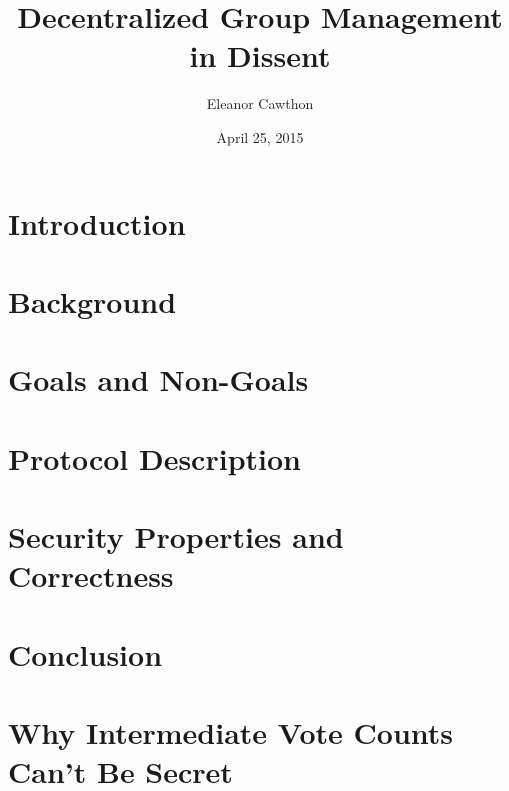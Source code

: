 \documentclass[finalcopy,nolof,nolot]{srpaper}
\title{Decentralized Group Management in Dissent}
\author{Eleanor Cawthon}
\date{April 25, 2015}
\begin{document}
\frontmatter

\chapter{Introduction}\label{Chapter:Intro}


\chapter{Background}\label{Chapter:Background}


\chapter{Goals and Non-Goals}\label{Chapter:Security}


\chapter{Protocol Description}\label{Chapter:Protocol}


\chapter{Security Properties and Correctness}\label{Chapter:Proofs}


\chapter{Conclusion}\label{Chapter:Conclusion}
\listoftodos


\appendix
\chapter{Why Intermediate Vote Counts Can't Be
Secret}\label{Appendix:SecretProof}

\end{document}
